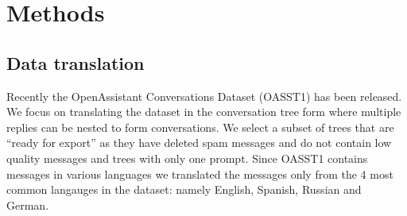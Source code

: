 \documentclass[fleqn,moreauthors,10pt]{ds_report}
\begin{document}
    



\section*{Methods}

    \subsection*{Data translation}
    
    Recently the OpenAssistant Conversations Dataset (OASST1) has been released.
    We focus on translating the dataset in the conversation tree form where multiple replies can be nested to form conversations.
    We select a subset of trees that are ``ready for export'' as they have deleted spam messages and do not contain low quality messages and trees with only one prompt.
    Since OASST1 contains messages in various languages we translated the messages only from the 4 most common langauges in the dataset: namely English, Spanish, Russian and German.
    
\end{document}
